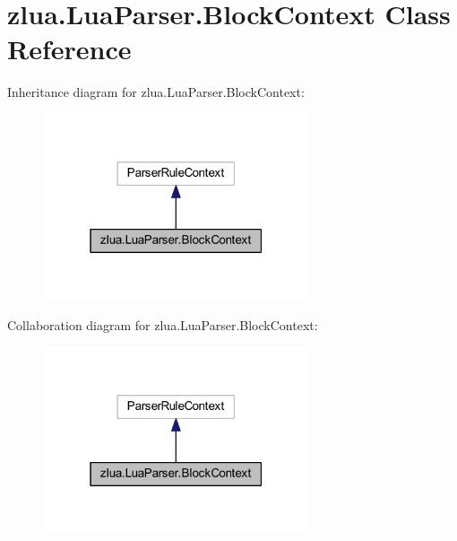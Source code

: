 \hypertarget{classzlua_1_1_lua_parser_1_1_block_context}{}\section{zlua.\+Lua\+Parser.\+Block\+Context Class Reference}
\label{classzlua_1_1_lua_parser_1_1_block_context}


Inheritance diagram for zlua.\+Lua\+Parser.\+Block\+Context\+:
\nopagebreak
\begin{figure}[H]
\begin{center}
\leavevmode
\includegraphics[width=223pt]{classzlua_1_1_lua_parser_1_1_block_context__inherit__graph}
\end{center}
\end{figure}


Collaboration diagram for zlua.\+Lua\+Parser.\+Block\+Context\+:
\nopagebreak
\begin{figure}[H]
\begin{center}
\leavevmode
\includegraphics[width=223pt]{classzlua_1_1_lua_parser_1_1_block_context__coll__graph}
\end{center}
\end{figure}
